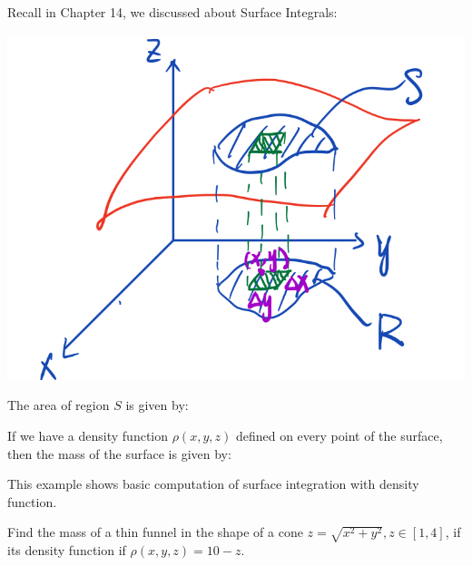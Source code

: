 \begin{spacing}{1.3}
    {\blue Recall in Chapter 14, we discussed about Surface Integrals:}
    \begin{center}
        \includegraphics[scale=0.24]{images/Ch14-surface-area.jpeg}
    \end{center}
    The area of region $S$ is given by:
    \begin{center}
    \end{center}
    If we have a density function $\rho (x,y,z)$ defined on every point of the surface,
    then the mass of the surface is given by:
    \begin{center}
    \end{center}

    

    \newpage
    {\blue This example shows basic computation of surface integration with density function.}
    
    \eg Find the mass of a thin funnel in the shape of a cone $z=\sqrt{x^2+y^2}, z\in [1,4]$,
    if its density function if $\rho(x,y,z)=10-z$.


\end{spacing}
